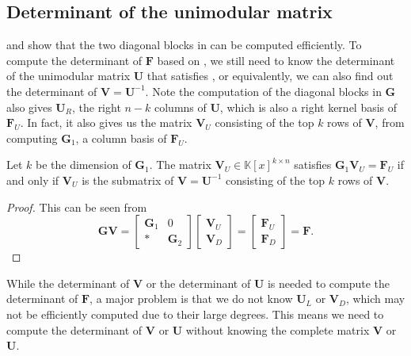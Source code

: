 
\subsection{Determinant of the unimodular matrix}

 and 
show that the two diagonal blocks in 
can be computed efficiently. To compute the determinant of $\mathbf{F}$
based on , we still need
to know the determinant of the unimodular matrix $\mathbf{U}$ that
satisfies , or equivalently, we can also
find out the determinant of $\mathbf{V}=\mathbf{U}^{-1}$. Note the
computation of the diagonal blocks in $\mathbf{G}$ also gives $\mathbf{U}_{R}$,
the right $n-k$ columns of $\mathbf{U}$, which is also a right kernel
basis of $\mathbf{F}_{U}$. In fact, it also gives us the matrix $\mathbf{V}_{U}$
consisting of the top $k$ rows of $\mathbf{V}$, from computing $\mathbf{G}_{1}$,
a column basis of $\mathbf{F}_{U}$.
\begin{lem}
Let $k$ be the dimension of $\mathbf{G}_{1}$. The matrix $\mathbf{V}_{U}\in\mathbb{K}\left[x\right]^{k\times n}$
satisfies $\mathbf{G}_{1}\mathbf{V}_{U}=\mathbf{F}_{U}$ if and only
if $\mathbf{V}_{U}$ is the submatrix of $\mathbf{V}=\mathbf{U}^{-1}$
consisting of the top $k$ rows of $\mathbf{V}$. \end{lem}
\begin{proof}
This can be seen from 
\[
\mathbf{G}\mathbf{V}=\begin{bmatrix}\mathbf{G}_{1} & 0\\
* & \mathbf{G}_{2}
\end{bmatrix}\begin{bmatrix}\mathbf{V}_{U}\\
\mathbf{V}_{D}
\end{bmatrix}=\begin{bmatrix}\mathbf{F}_{U}\\
\mathbf{F}_{D}
\end{bmatrix}=\mathbf{F}.
\]

\end{proof}
While the determinant of $\mathbf{V}$ or the determinant of $\mathbf{U}$
is needed to compute the determinant of $\mathbf{F}$, a major problem
is that we do not know $\mathbf{U}_{L}$ or $\mathbf{V}_{D}$, which
may not be efficiently computed due to their large degrees. This means
we need to compute the determinant of $\mathbf{V}$ or $\mathbf{U}$
without knowing the complete matrix $\mathbf{V}$ or $\mathbf{U}$.
